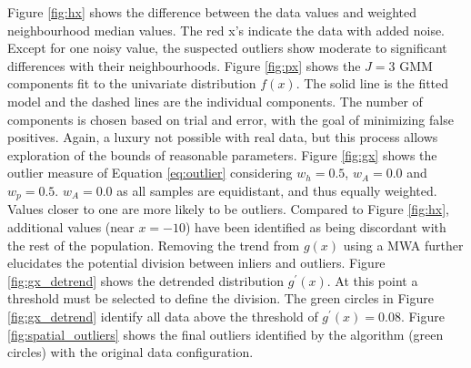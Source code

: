 Figure \ref{fig:hx} shows the difference between the data values and weighted neighbourhood median values. The red x's indicate the data with added noise. Except for one noisy value, the suspected outliers show moderate to significant differences with their neighbourhoods. Figure \ref{fig:px} shows the $J=3$ \gls{GMM} components fit to the univariate distribution $f(x)$. The solid line is the fitted model and the dashed lines are the individual components. The number of components is chosen based on trial and error, with the goal of minimizing false positives. Again, a luxury not possible with real data, but this process allows  exploration of the bounds of reasonable parameters. Figure \ref{fig:gx} shows the outlier measure of Equation \ref{eq:outlier} considering $w_{h}=0.5$, $w_{A}=0.0$ and $w_{p}=0.5$. $w_{A}=0.0$ as all samples are equidistant, and thus equally weighted. Values closer to one are more likely to be outliers. Compared to Figure \ref{fig:hx}, additional values (near $x=-10$) have been identified as being discordant with the rest of the population. Removing the trend from $g(x)$ using a \gls{MWA} further elucidates the potential division between inliers and outliers. Figure \ref{fig:gx_detrend} shows the detrended distribution $g^{\prime}(x)$. At this point a threshold must be selected to define the division. The green circles in Figure \ref{fig:gx_detrend} identify all data above the threshold of $g^{\prime}(x)=0.08$. Figure \ref{fig:spatial_outliers} shows the final outliers identified by the algorithm (green circles) with the original data configuration.

